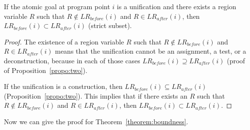 \documentclass{tlp}
\newcommand{\LRb}[1]{\ensuremath{\mathit{LR}_{before}(#1)}}
\newcommand{\LRa}[1]{\ensuremath{\mathit{LR}_{after}(#1)}}
\begin{document}
\begin{proposition}
\label{propo:three}
    If the atomic goal at program point $i$ is a unification
    and there exists a region variable $R$ such that
    $R \not\in \LRb{i}$ and $R \in \LRa{i}$,
    then $\LRb{i} \subset \LRa{i}$ (strict subset).
\end{proposition}
\begin{proof}
    The existence of a region variable $R$ such that
    $R \not\in \LRb{i}$ and $R \in \LRa{i}$ means that the unification
    cannot be an assignment, a test, or a deconstruction,
    because in each of those cases $\LRb{i} \supseteq \LRa{i}$
    (proof of Proposition~\ref{propo:two}).

    If the unification is a construction,
    then $\LRb{i} \subseteq \LRa{i}$ (Proposition~\ref{propo:two}).
    This implies that if there exists an $R$
    such that $R \not\in \LRb{i}$ and $R \in \LRa{i}$,
    then $\LRb{i} \subset \LRa{i}$.
\end{proof}

Now we can give the proof for Theorem~\ref{theorem:boundness}.
\end{document}

